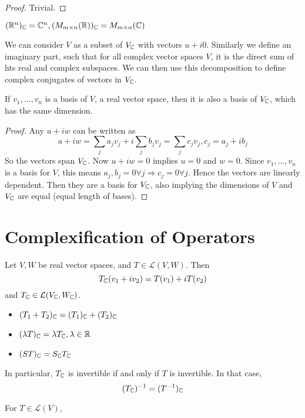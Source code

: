 \documentclass[12pt]{article}
\begin{document}
\begin{proof}
    Trivial.
\end{proof}

\begin{ex}
    $(\mathbb{R}^n)_{\mathbb{C}} = \mathbb{C}^n, (M_{m\times n}(\mathbb{R}))_{\mathbb{C}} = M_{m\times n}(\mathbb{C})$
\end{ex}

We can consider $V$ as a subset of $V_{\mathbb{C}}$ with vectors $u+i0$. Similarly we define an imaginary part, such that for all complex vector spaces $V$, it is the direct sum of hts real and complex subspaces. We can then use this decomposition to define complex conjugates of vectors in $V_{\mathbb{C}}$.

\begin{prop}
    If $v_1,\dots,v_n$ is a basis of $V$, a real vector space, then it is also a basis of $V_{\mathbb{C}}$, which has the same dimension.
\end{prop}

\begin{proof}
    Any $u+iw$ can be written as
    $$u+iw = \sum_j a_jv_j + i\sum_j b_jv_j = \sum_j c_jv_j, c_j = a_j + ib_j$$
    So the vectors span $V_{\mathbb{C}}$. Now $u+iw = 0$ implies $u=0$ and $w=0$. Since $v_1,\dots,v_n$ is a basis for $V$, this means $a_j,b_j = 0 \forall j \Rightarrow c_j = 0 \forall j$. Hence the vectors are linearly dependent. Then they are a basis for $V_{\mathbb{C}}$, also implying the dimensions of $V$ and $V_{\mathbb{C}}$ are equal (equal length of bases).
\end{proof}

\section{Complexification of Operators}
Let $V,W$ be real vector spaces, and $T \in \mathcal L(V,W)$. Then
$$T_{\mathbb{C}}(v_1 + iv_2) = T(v_1) + iT(v_2)$$
and $T_{\mathbb{C}} \in \mathcal L(V_{\mathbb{C}},W_{\mathbb{C}})$.

\begin{itemize}
    \item $(T_1+T_2)_{\mathbb{C}} = (T_1)_{\mathbb{C}} + (T_2)_{\mathbb{C}}$
    \item $(\lambda T)_{\mathbb{C}} = \lambda T_{\mathbb{C}}, \lambda \in \mathbb{R}$
    \item $(ST)_{\mathbb{C}} = S_{\mathbb{C}} T_{\mathbb{C}}$
\end{itemize}

In particular, $T_{\mathbb{C}}$ is invertible if and only if $T$ is invertible. In that case,
$$(T_{\mathbb{C}})^{-1} = (T^{-1})_{\mathbb{C}}$$

For $T \in \mathcal L(V)$,
\end{document}

